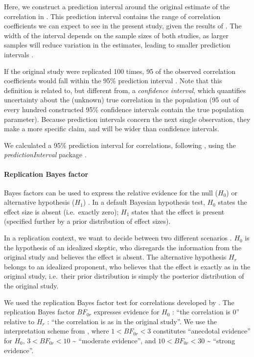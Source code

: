 \documentclass[11pt,english,]{memoir}
\let\oldparagraph\paragraph
\renewcommand{\paragraph}[1]{\oldparagraph{#1}\mbox{}}
\begin{document}
Here, we construct a prediction interval around the original estimate of the correlation in \textcite{London2015}. This prediction interval contains the range of correlation coefficients we can expect to see in the present study, given the results of \textcite{London2015}. The width of the interval depends on the sample sizes of both studies, as larger samples will reduce variation in the estimates, leading to smaller prediction intervals \autocite{Patil2016}.

If the original study were replicated 100 times, 95 of the observed correlation coefficients would fall within the 95\% prediction interval \autocite{Patil2016}. Note that this definition is related to, but different from, a \emph{confidence interval}, which quantifies uncertainty about the (unknown) true correlation in the population (95 out of every hundred constructed 95\% confidence intervals contain the true population parameter). Because prediction intervals concern the next single observation, they make a more specific claim, and will be wider than confidence intervals.

We calculated a 95\% prediction interval for correlations, following \textcite{Spence2016}, using the \emph{predictionInterval} package \autocite[Version NA;][]{R-predictionInterval}.

\hypertarget{repBF}{%
\paragraph{Replication Bayes factor}\label{repBF}}

Bayes factors can be used to express the relative evidence for the null (\(H_0\)) or alternative hypothesis (\(H_1\)) \autocite{Wagenmakers2018a}. In a default Bayesian hypothesis test, \(H_0\) states the effect size is absent (i.e.~exactly zero); \(H_1\) states that the effect is present (specified further by a prior distribution of effect sizes).

In a replication context, we want to decide between two different scenarios \autocite{Verhagen2014}. \(H_0\) is the hypothesis of an idealized skeptic, who disregards the information from the original study and believes the effect is absent. The alternative hypothesis \(H_r\) belongs to an idealized proponent, who believes that the effect is exactly as in the original study, i.e.~their prior distribution is simply the posterior distribution of the original study.

We used the replication Bayes factor test for correlations developed by \textcite{Wagenmakers2016}. The replication Bayes factor \(BF_{0r}\) expresses evidence for \(H_0\) : ``the correlation is 0'' relative to \(H_r\) : ``the correlation is as in the original study''. We use the interpretation scheme from \textcite{Wagenmakers2018}, where \(1 < BF_{0r} < 3\) constitutes ``anecdotal evidence'' for \(H_0\), \(3 < BF_{0r} < 10\) \textasciitilde{} ``moderate evidence'', and \(10 < BF_{0r} < 30\) \textasciitilde{} ``strong evidence''.
\end{document}
